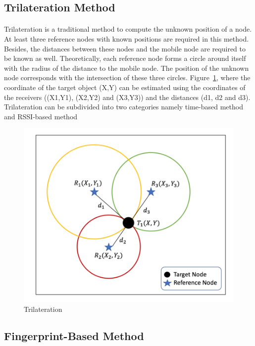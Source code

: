\subsection{Trilateration Method}
\paragraph{}Trilateration is a traditional method to compute the unknown position of a node. At least three reference nodes with known positions are required in this method. Besides, the distances between these nodes and the mobile node are required to be known as well. Theoretically, each reference node forms a circle around itself with the radius of the distance to the mobile node. The position of the unknown node corresponds with the intersection of these three circles. Figure~\ref{fig:tri}, where the coordinate of the target object (X,Y) can be estimated using the coordinates of the receivers ((X1,Y1), (X2,Y2) and (X3,Y3)) and the distances (d1, d2 and d3).  Trilateration can be subdivided into two categories namely time-based method and RSSI-based method
\begin{figure}[h]
\centering
\includegraphics[scale = 0.7]{Image/trileteration.png}
\caption{Trilateration}
\label{fig:tri}
\end{figure}

\newpage
\subsection{Fingerprint-Based Method}
